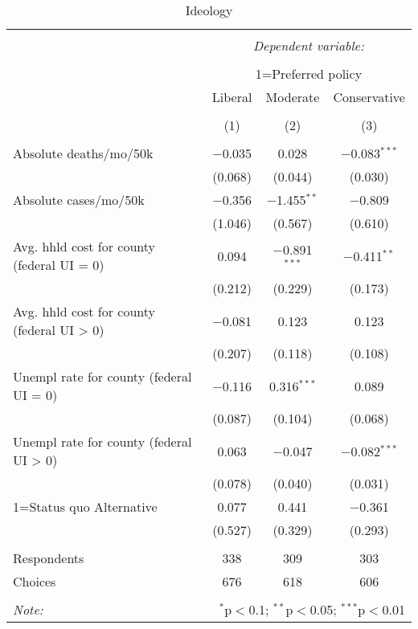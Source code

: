 
\begin{table}[!htbp] \centering 
  \caption{Ideology} 
  \label{} 
\begin{tabular}{@{\extracolsep{5pt}}lccc} 
\\[-1.8ex]\hline 
\hline \\[-1.8ex] 
 & \multicolumn{3}{c}{\textit{Dependent variable:}} \\ 
\cline{2-4} 
\\[-1.8ex] & \multicolumn{3}{c}{1=Preferred policy} \\ 
 & Liberal & Moderate & Conservative \\ 
\\[-1.8ex] & (1) & (2) & (3)\\ 
\hline \\[-1.8ex] 
 Absolute deaths/mo/50k & $-$0.035 & 0.028 & $-$0.083$^{***}$ \\ 
  & (0.068) & (0.044) & (0.030) \\ 
  Absolute cases/mo/50k & $-$0.356 & $-$1.455$^{**}$ & $-$0.809 \\ 
  & (1.046) & (0.567) & (0.610) \\ 
  Avg. hhld cost for county (federal UI = 0) & 0.094 & $-$0.891$^{***}$ & $-$0.411$^{**}$ \\ 
  & (0.212) & (0.229) & (0.173) \\ 
  Avg. hhld cost for county (federal UI > 0) & $-$0.081 & 0.123 & 0.123 \\ 
  & (0.207) & (0.118) & (0.108) \\ 
  Unempl rate for county (federal UI = 0) & $-$0.116 & 0.316$^{***}$ & 0.089 \\ 
  & (0.087) & (0.104) & (0.068) \\ 
  Unempl rate for county (federal UI > 0) & 0.063 & $-$0.047 & $-$0.082$^{***}$ \\ 
  & (0.078) & (0.040) & (0.031) \\ 
  1=Status quo Alternative & 0.077 & 0.441 & $-$0.361 \\ 
  & (0.527) & (0.329) & (0.293) \\ 
 \hline \\[-1.8ex] 
Respondents & 338 & 309 & 303\\ 
 Choices & 676 & 618 & 606\\ 
\hline 
\hline \\[-1.8ex] 
\textit{Note:}  & \multicolumn{3}{r}{$^{*}$p$<$0.1; $^{**}$p$<$0.05; $^{***}$p$<$0.01} \\ 
\end{tabular} 
\end{table} 
